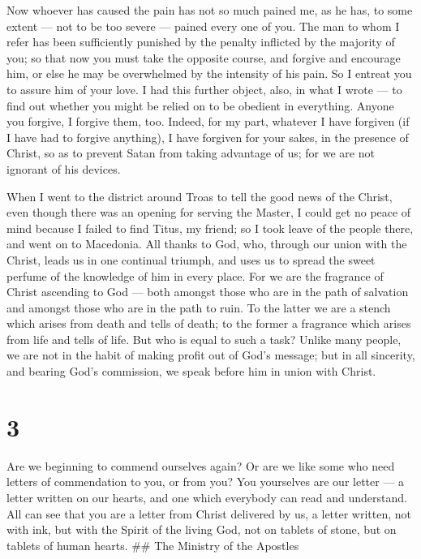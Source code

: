  Now whoever has caused the pain has not so much pained me,
as he has, to some extent --- not to be too severe --- pained every one
of you.  The man to whom I refer has been sufficiently
punished by the penalty inflicted by the majority of you; 
so that now you must take the opposite course, and forgive and encourage
him, or else he may be overwhelmed by the intensity of his pain.
 So I entreat you to assure him of your love.  I
had this further object, also, in what I wrote --- to find out whether
you might be relied on to be obedient in everything. 
Anyone you forgive, I forgive them, too. Indeed, for my part, whatever I
have forgiven (if I have had to forgive anything), I have forgiven for
your sakes, in the presence of Christ,  so as to prevent
Satan from taking advantage of us; for we are not ignorant of his
devices.

 When I went to the district around Troas to tell the good
news of the Christ, even though there was an opening for serving the
Master,  I could get no peace of mind because I failed to
find Titus, my friend; so I took leave of the people there, and went on
to Macedonia.  All thanks to God, who, through our union
with the Christ, leads us in one continual triumph, and uses us to
spread the sweet perfume of the knowledge of him in every place.
 For we are the fragrance of Christ ascending to God ---
both amongst those who are in the path of salvation and amongst those
who are in the path to ruin.  To the latter we are a stench
which arises from death and tells of death; to the former a fragrance
which arises from life and tells of life. But who is equal to such a
task?  Unlike many people, we are not in the habit of
making profit out of God's message; but in all sincerity, and bearing
God's commission, we speak before him in union with Christ.

\hypertarget{section-2}{%
\section{3}\label{section-2}}

 Are we beginning to commend ourselves again? Or are we like
some who need letters of commendation to you, or from you? 
You yourselves are our letter --- a letter written on our hearts, and
one which everybody can read and understand.  All can see
that you are a letter from Christ delivered by us, a letter written, not
with ink, but with the Spirit of the living God, not on tablets of
stone, but on tablets of human hearts. \#\# The Ministry of the Apostles

